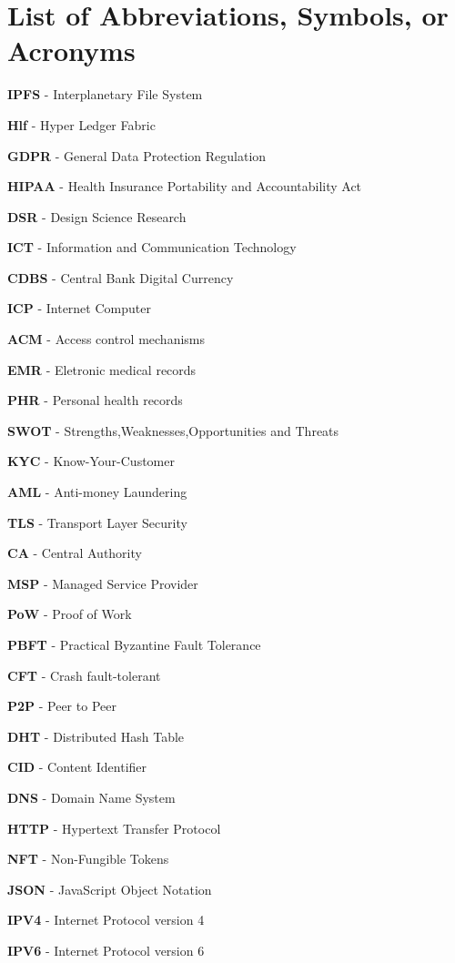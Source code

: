 \section{List of Abbreviations, Symbols, or Acronyms} 
\textbf{}
 
\textbf{IPFS} - Interplanetary File System

\textbf{Hlf} - Hyper Ledger Fabric

\textbf{GDPR} - General Data Protection Regulation

\textbf{HIPAA} - Health Insurance Portability and Accountability Act

\textbf{DSR} - Design Science Research

\textbf{ICT} - Information and Communication Technology

\textbf{CDBS} - Central Bank Digital Currency

\textbf{ICP} - Internet Computer

\textbf{ACM} - Access control mechanisms 

\textbf{EMR} - Eletronic medical records

\textbf{PHR} - Personal health records

\textbf{SWOT} - Strengths,Weaknesses,Opportunities and Threats

\textbf{KYC} - Know-Your-Customer

\textbf{AML} - Anti-money Laundering

\textbf{TLS} - Transport Layer Security

\textbf{CA} - Central Authority

\textbf{MSP} - Managed Service Provider

\textbf{PoW} - Proof of Work

\textbf{PBFT} - Practical Byzantine Fault Tolerance

\textbf{CFT} - Crash fault-tolerant

\textbf{P2P} - Peer to Peer

\textbf{DHT} - Distributed Hash Table

\textbf{CID} - Content Identifier

\textbf{DNS} - Domain Name System

\textbf{HTTP} - Hypertext Transfer Protocol

\textbf{NFT} - Non-Fungible Tokens

\textbf{JSON} - JavaScript Object Notation

\textbf{IPV4} - Internet Protocol version 4

\textbf{IPV6} - Internet Protocol version 6


